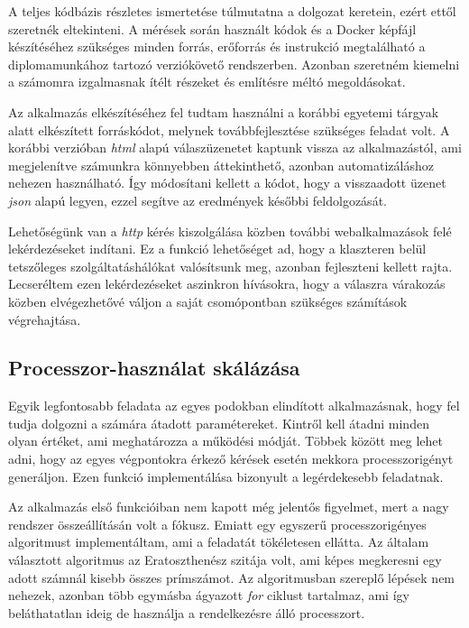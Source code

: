A teljes kódbázis részletes ismertetése túlmutatna a dolgozat keretein, ezért ettől szeretnék eltekinteni.
A mérések során használt kódok és a Docker képfájl készítéséhez szükséges minden forrás, erőforrás és instrukció megtalálható a diplomamunkához tartozó verziókövető rendszerben\citep{gitRepo}. 
Azonban szeretném kiemelni a számomra izgalmasnak ítélt részeket és említésre méltó megoldásokat.

Az alkalmazás elkészítéséhez fel tudtam használni a korábbi egyetemi tárgyak alatt elkészített forráskódot, melynek továbbfejlesztése szükséges feladat volt.
A korábbi verzióban \textit{html} alapú válaszüzenetet kaptunk vissza az alkalmazástól, ami megjelenítve számunkra könnyebben áttekinthető, azonban automatizáláshoz nehezen használható.
Így módosítani kellett a kódot, hogy a visszaadott üzenet \textit{json} alapú legyen, ezzel segítve az eredmények későbbi feldolgozását.

Lehetőségünk van a \textit{http} kérés kiszolgálása közben további webalkalmazások felé lekérdezéseket indítani.
Ez a funkció lehetőséget ad, hogy a klaszteren belül tetszőleges szolgáltatáshálókat valósítsunk meg, azonban fejleszteni kellett rajta.
Lecseréltem ezen lekérdezéseket aszinkron hívásokra, hogy a válaszra várakozás közben elvégezhetővé váljon a saját csomópontban szükséges számítások végrehajtása. 

\subsection{Processzor-használat skálázása}
Egyik legfontosabb feladata az egyes podokban elindított alkalmazásnak, hogy fel tudja dolgozni a számára átadott paramétereket.
Kintről kell átadni minden olyan értéket, ami meghatározza a működési módját.
Többek között meg lehet adni, hogy az egyes végpontokra érkező kérések esetén mekkora processzorigényt generáljon.
Ezen funkció implementálása bizonyult a legérdekesebb feladatnak.

Az alkalmazás első funkcióiban nem kapott még jelentős figyelmet, mert a nagy rendszer összeállításán volt a fókusz.
Emiatt egy egyszerű processzorigényes algoritmust implementáltam, ami a feladatát tökéletesen ellátta.
Az általam választott algoritmus az Eratoszthenész szitája\citep{sieveOfEratosthenes} volt, ami képes megkeresni egy adott számnál kisebb összes prímszámot.
Az algoritmusban szereplő lépések nem nehezek, azonban több egymásba ágyazott \textit{for} ciklust tartalmaz, ami így beláthatatlan ideig de használja a rendelkezésre álló processzort.

